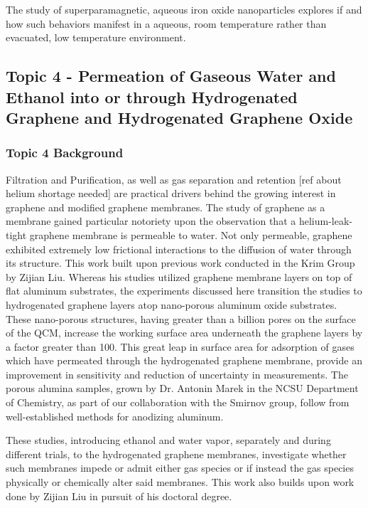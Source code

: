 The study of superparamagnetic, aqueous iron oxide nanoparticles explores if and how such behaviors manifest in a aqueous, room temperature rather than evacuated, low temperature environment.


\subsection{Topic 4 - Permeation of Gaseous Water and Ethanol into or through Hydrogenated Graphene and Hydrogenated Graphene Oxide}

\subsubsection{Topic 4 Background}
Filtration and Purification, as well as gas separation and retention [ref about helium shortage needed] are practical drivers behind the growing interest in graphene and modified graphene membranes. The study of graphene as a membrane gained particular notoriety upon the observation that a helium-leak-tight graphene membrane is permeable to water\cite{108}. Not only permeable, graphene exhibited extremely low frictional interactions to the diffusion of water through its structure. This work built upon previous work conducted in the Krim Group by Zijian Liu. Whereas his studies utilized graphene membrane layers on top of flat aluminum substrates, the experiments discussed here transition the studies to hydrogenated graphene layers atop nano-porous aluminum oxide substrates. These nano-porous structures, having greater than a billion pores  on the surface of the QCM, increase the working surface area underneath the graphene layers by a factor greater than 100. This great leap in surface area for adsorption of gases which have permeated through the hydrogenated graphene membrane, provide an improvement in sensitivity and reduction of uncertainty in measurements. The porous alumina samples, grown by Dr. Antonin Marek in the NCSU Department of Chemistry, as part of our collaboration with the Smirnov group, follow from well-established methods for anodizing aluminum\cite{109}.

These studies, introducing ethanol and water vapor, separately and during different trials, to the hydrogenated graphene membranes, investigate whether such membranes impede or admit either gas species or if instead the gas species physically or chemically alter said membranes. This work also builds upon work done by Zijian Liu in pursuit of his doctoral degree.

